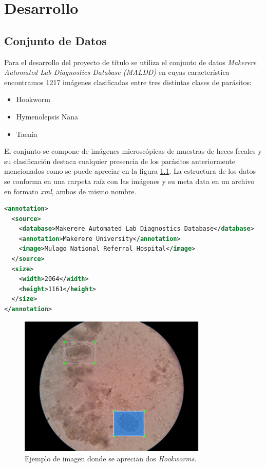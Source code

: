 \documentclass[letter,12pt]{report}
\begin{document}
\chapter{Desarrollo}
\section{Conjunto de Datos}
Para el desarrollo del proyecto de título se utiliza el conjunto de datos \textit{Makerere
Automated Lab Diagnostics Database (MALDD)} en cuyas característica encontramos 1217 imágenes 
clasificadas entre tres distintas clases de parásitos:

\begin{itemize}
    \item Hookworm
    \item Hymenolepsis Nana
    \item Taenia
\end{itemize}

El conjunto se compone de imágenes microscópicas de muestras de heces fecales y su
clasificación destaca cualquier presencia de los parásitos anteriormente mencionados
como se puede apreciar en la figura \ref{fig:labelImage}. La estructura de los datos se
conforma en una carpeta raíz con las imágenes y su meta data en un archivo en formato
\textit{xml}, ambos de mismo nombre.

\begin{lstlisting}[language=xml]
<annotation>
  <source>
    <database>Makerere Automated Lab Diagnostics Database</database>
    <annotation>Makerere University</annotation>
    <image>Mulago National Referral Hospital</image>
  </source>
  <size>
    <width>2064</width>
    <height>1161</height>
  </size>
</annotation>
\end{lstlisting}

\begin{figure}[ht]
    \centering
    \includegraphics[width=0.8\textwidth]{labelImage}
    \caption{Ejemplo de imagen donde se aprecian dos \textit{Hookworms}.}
    \label{fig:labelImage}
\end{figure}
\end{document}
